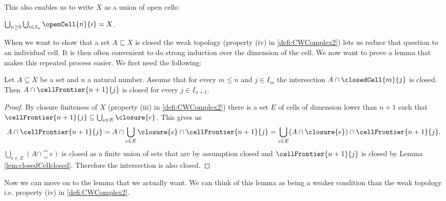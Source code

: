 This also enables us to write $X$ as a union of open cells:

\begin{cor} \label{cor:complexeqopencells}
    $\bigcup_{n \ge 0}\bigcup_{i \in I_n} \openCell{n}{i} = X$.
\end{cor}

When we want to show that a set $A \subseteq X$ is closed the weak topology (property (iv) in \ref{defi:CWComplex2}) lets us reduce that question to an individual cell.
It is then often convenient to do strong induction over the dimension of the cell.
We now want to prove a lemma that makes this repeated process easier.
We first need the following:

\begin{lem}\label{lem:inductioncellFrontierclosed}
    Let $A \subseteq X$ be a set and $n$ a natural number.
    Assume that for every $m \le n$ and $j \in I_m$ the intersection $A \cap \closedCell{m}{j}$ is closed.
    Then $A \cap \cellFrontier{n + 1}{j}$ is closed for every $j \in I_{n + 1}$.
\end{lem}
\begin{proof}
    By closure finiteness of $X$ (property (iii) in \ref{defi:CWComplex2}) there is a set $E$ of cells of dimension lower than $n + 1$ such that $\cellFrontier{n + 1}{j} \subseteq \bigcup_{e \in E}\closure{e}$.
    This gives us
    \[A \cap \cellFrontier{n + 1}{j} = A \cap \bigcup_{e \in E}\closure{e} \cap \cellFrontier{n + 1}{j} = \bigcup_{e \in E}(A \cap \closure{e}) \cap \cellFrontier{n + 1}{j}.\]
    $\bigcup_{e \in E}(A \cap \closure{e})$ is closed as a finite union of sets that are by assumption closed and $\cellFrontier{n + 1}{j}$ is closed by Lemma \ref{lem:closedCellclosed}. Therefore the intersection is also closed.
\end{proof}

Now we can move on to the lemma that we actually want.
We can think of this lemma as being a weaker condition than the weak topology i.e. property (iv) in \ref{defi:CWComplex2}.

